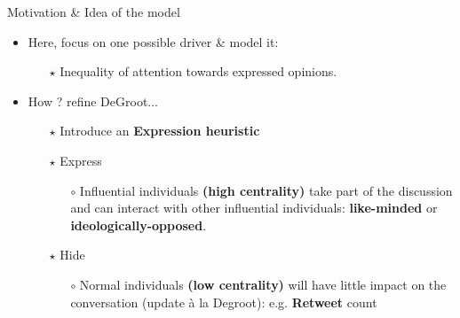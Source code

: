 \documentclass[xcolor=table]{beamer}
\begin{document}
\begin{frame}{Motivation \& Idea of the model}
\begin{itemize} \setlength\itemsep{1em}
	\item Here, focus on one possible driver \& model it: 
		\begin{itemize} \setlength\itemsep{1em}
			\item[$\star$] Inequality of attention towards expressed opinions. 
		\end{itemize}
	\item How ? refine DeGroot...
		\begin{itemize}  \setlength\itemsep{1em}
			\item[$\star$] Introduce an {\bf\color{purple}Expression heuristic}
			\item[$\star$] Express  \begin{itemize} \item[$\circ$] Influential individuals {\bf\color{purple}(high centrality)} take part of the discussion and can interact with other influential individuals: {\bf\color{purple}like-minded} or {\bf\color{purple}ideologically-opposed}. \end{itemize}
			\item[$\star$] Hide \begin{itemize} \item[$\circ$] Normal individuals {\bf\color{purple}(low centrality)} will have little impact on the conversation (update \`{a} la Degroot): e.g. {\bf\color{purple}Retweet} count  \end{itemize}
		\end{itemize}
\end{itemize}
\end{frame}
\end{document}
